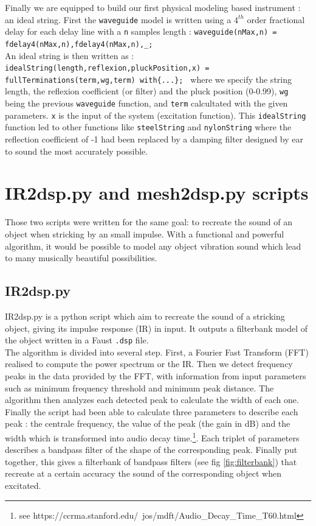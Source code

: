 \documentclass[11pt,a4paper]{article}
\begin{document}
Finally we are equipped to build our first physical modeling based instrument : an ideal string. First the \texttt{waveguide} model is written using a $4^{th}$ order fractional delay for each delay line with a \texttt{n} samples length : \texttt{waveguide(nMax,n) = fdelay4(nMax,n),fdelay4(nMax,n),\_;}\\
An ideal string is then written as :
\texttt{idealString(length,reflexion,pluckPosition,x) = fullTerminations(term,wg,term)
	with\{...\};	
} where we specify the string length, the reflexion coefficient (or filter) and the pluck position (0-0.99), \texttt{wg} being the previous \texttt{waveguide} function, and \texttt{term} calcultated with the given parameters. \texttt{x} is the input of the system (excitation function).
This \texttt{idealString} function led to other functions like \texttt{steelString} and \texttt{nylonString} where the reflection coefficient of -1 had been replaced by a damping filter designed by ear to sound the most accurately possible.

\section{IR2dsp.py and mesh2dsp.py scripts}

Those two scripts were written  for the same goal: to recreate the sound of an object when stricking by an small impulse. With a functional and powerful algorithm, it would be possible to model any object vibration sound which lead to many musically beautiful possibilities.

\subsection*{IR2dsp.py}

IR2dsp.py is a python script which aim to recreate the sound of a stricking object, giving its impulse response (IR) in input. It outputs a filterbank model of the object written in a Faust \texttt{.dsp} file.\\
The algorithm is divided into several step. First, a Fourier Fast Transform (FFT) realised to compute the power spectrum or the IR. Then we detect frequency peaks in the data provided by the FFT, with information from input parameters such as minimum frequency threshold and minimum peak distance. The algorithm then analyzes each detected peak to calculate the width of each one.\\
Finally the script had been able to calculate three parameters to describe each peak : the centrale frequency, the value of the peak (the gain in dB) and the width which is transformed into audio decay time.\footnote{see https://ccrma.stanford.edu/~jos/mdft/Audio\_Decay\_Time\_T60.html}. Each triplet of parameters describes a bandpass filter of the shape of the corresponding peak. Finally put together, this gives a filterbank of bandpass filters (see fig \ref{fig:filterbank}) that recreate at a certain accuracy the sound of the corresponding object when excitated.
\end{document}
